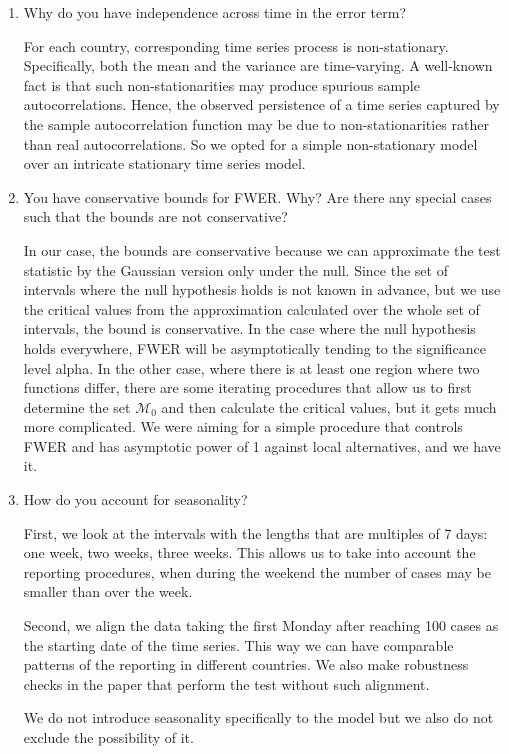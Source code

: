 \documentclass[a4paper,12pt]{article}
\numberwithin{equation}{section}
\begin{document}
\begin{enumerate}
\item Why do you have independence across time in the error term?

For each country, corresponding time series process is non-stationary. Specifically, both the mean and the variance are time-varying. A well-known fact is that such non-stationarities may produce spurious sample autocorrelations. Hence, the observed persistence of a time series captured by the sample autocorrelation function may be due to non-stationarities rather than real autocorrelations. So we opted for a simple non-stationary model over an intricate stationary time series model.

\item You have conservative bounds for FWER. Why? Are there any special cases such that the bounds are not conservative?
	
	In our case, the bounds are conservative because we can approximate the test statistic by the Gaussian version only under the null. Since the set of intervals where the null hypothesis holds is not known in advance, but we use the critical values from the approximation calculated over the whole set of intervals, the bound is conservative. In the case where the null hypothesis holds everywhere, FWER will be asymptotically tending to the significance level alpha. In the other case, where there is at least one region where two functions differ, there are some iterating procedures that allow us to first determine the set $\mathcal{M}_0$ and then calculate the critical values, but it gets much more complicated. We were aiming for a simple procedure that controls FWER and has asymptotic power of 1 against local alternatives, and we have it.

\item How do you account for seasonality?
	
	First, we look at the intervals with the lengths that are multiples of 7 days: one week, two weeks, three weeks. This allows us to take into account the reporting procedures, when during the weekend the number of cases may be smaller than over the week.
	
	Second, we align the data taking the first Monday after reaching 100 cases as the starting date of the time series. This way we can have comparable patterns of the reporting in different countries. We also make robustness checks in the paper that perform the test without such alignment.
	
	We do not introduce seasonality specifically to the model but we also do not exclude the possibility of it.


\end{enumerate}
\end{document}
